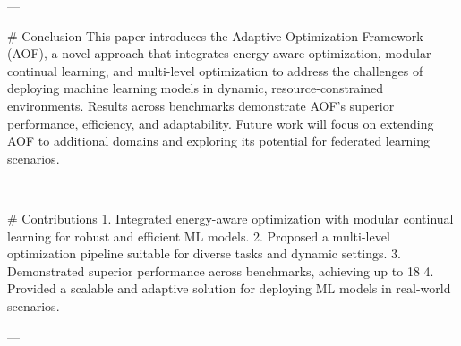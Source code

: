 ---

# Conclusion  
This paper introduces the Adaptive Optimization Framework (AOF), a novel approach that integrates energy-aware optimization, modular continual learning, and multi-level optimization to address the challenges of deploying machine learning models in dynamic, resource-constrained environments. Results across benchmarks demonstrate AOF's superior performance, efficiency, and adaptability. Future work will focus on extending AOF to additional domains and exploring its potential for federated learning scenarios.

---

# Contributions  
1. Integrated energy-aware optimization with modular continual learning for robust and efficient ML models.  
2. Proposed a multi-level optimization pipeline suitable for diverse tasks and dynamic settings.  
3. Demonstrated superior performance across benchmarks, achieving up to 18%
4. Provided a scalable and adaptive solution for deploying ML models in real-world scenarios.  

---